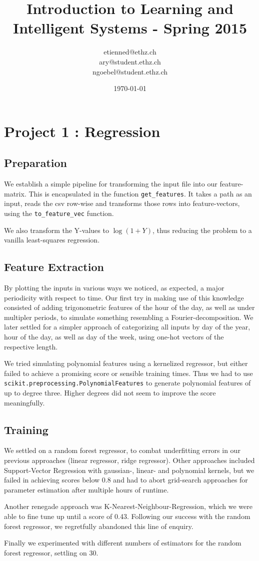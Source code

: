 \documentclass[a4paper, 11pt]{article}
\title{Introduction to Learning and Intelligent Systems - Spring 2015}
\author{etienned@ethz.ch\\ ary@student.ethz.ch\\ ngoebel@student.ethz.ch\\}
\date{\today}
\begin{document}
\maketitle

\section*{Project 1 : Regression}

\subsection*{Preparation}

We establish a simple pipeline for transforming the input file into our feature-matrix.
This is encapsulated in the function \texttt{get\_features}.
It takes a path as an input, reads the csv row-wise and
transforms those rows into feature-vectors, using the \texttt{to\_feature\_vec} function.

We also transform the Y-values to $\log(1 + Y)$, thus reducing the problem
to a vanilla least-squares regression.

\subsection*{Feature Extraction}

By plotting the inputs in various ways we noticed, as expected,
a major periodicity with respect to time. Our first try in making use
of this knowledge consisted of adding trigonometric features of the
hour of the day, as well as under multipler periods, to simulate something
resembling a Fourier-decomposition. We later settled for a simpler approach
of categorizing all inputs by day of the year, hour of the day, as well as day of the week,
using one-hot vectors of the respective length.

We tried simulating polynomial features using a kernelized regressor, but either
failed to achieve a promising score or sensible training times. Thus we
had to use \texttt{scikit.preprocessing.PolynomialFeatures} to generate polynomial
features of up to degree three. Higher degrees did not seem to improve the score meaningfully.


\subsection*{Training}

We settled on a random forest regressor, to combat underfitting errors in
our previous approaches (linear regressor, ridge regressor). Other approaches
included Support-Vector Regression with gaussian-, linear- and polynomial kernels,
but we failed in achieving scores below 0.8 and had to abort grid-search approaches
for parameter estimation after multiple hours of runtime.

Another renegade approach was K-Nearest-Neighbour-Regression, which we were able
to fine tune up until a score of 0.43. Following our success with the random forest regressor, we regretfully
abandoned this line of enquiry.

Finally we experimented with different numbers of estimators for the random forest regressor,
settling on 30.
\end{document}
